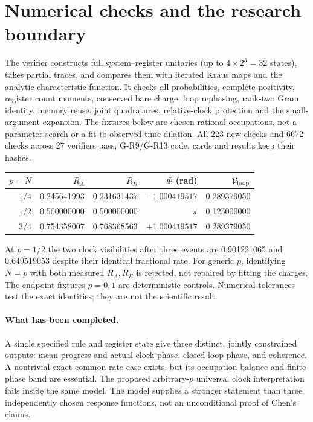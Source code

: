 \documentclass[11pt,a4paper]{article}
\begin{document}
\newpage
\section{Numerical checks and the research boundary}
The verifier constructs full system--register unitaries (up to
$4\times2^3=32$ states), takes partial traces, and compares them
with iterated Kraus maps and the analytic characteristic function.
It checks all probabilities, complete positivity, register count
moments, conserved bare charge, loop rephasing, rank-two Gram identity,
memory reuse, joint quadratures, relative-clock protection and the
small-argument expansion. The fixtures below are chosen rational
occupations, not a parameter search or a fit to observed time dilation.
All 223 new checks and 6672 checks across 27 verifiers pass;
G-R9/G-R13 code, cards and results keep their hashes.

\begin{center}
\begin{tabular}{rrrrr}\toprule
$p=N$&$R_A$&$R_B$&$\Phi$ (rad)&$\mathcal V_{\rm loop}$\\\midrule
$1/4$&0.245641993&0.231631437&$-1.000419517$&0.289379050\\
$1/2$&0.500000000&0.500000000&$\pi$&0.125000000\\
$3/4$&0.754358007&0.768368563&$+1.000419517$&0.289379050\\\bottomrule
\end{tabular}
\end{center}
At $p=1/2$ the two clock visibilities after three events are
0.901221065 and 0.649519053 despite their identical fractional rate.
For generic $p$, identifying $N=p$ with both measured $R_A,R_B$ is
rejected, not repaired by fitting the charges. The endpoint fixtures
$p=0,1$ are deterministic controls. Numerical tolerances test the exact
identities; they are not the scientific result.

\paragraph{What has been completed.}
A single specified rule and register state give three distinct,
jointly constrained outputs: mean progress and actual clock phase,
closed-loop phase, and coherence. A nontrivial exact common-rate
case exists, but its occupation balance and finite phase band are
essential. The proposed arbitrary-$p$ universal clock interpretation
fails inside the same model. The model supplies a stronger statement
than three independently chosen response functions, not an unconditional
proof of Chen's claims.
\end{document}
